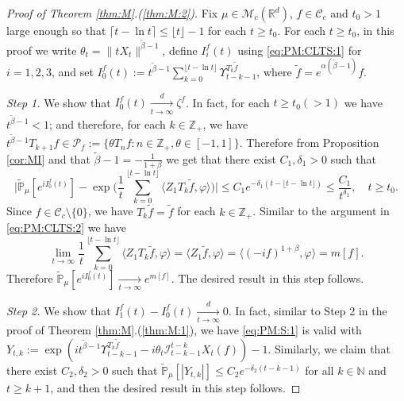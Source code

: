 \documentclass[EJP]{ejpecp} %
\begin{document}
\begin{proof}[Proof of Theorem \ref{thm:M}.(\ref{thm:M:2})]
	Fix $\mu\in \mathcal M_c(\mathbb R^d)$, $f\in \mathcal C_c$ and $t_0 > 1$ large enough so that $ \lceil t - \ln t\rceil \leq \lfloor t \rfloor - 1$ for each $t\geq t_0$.
	For each $t\geq t_0$, in this proof we write $\theta_t = \|t X_t\|^{\tilde \beta - 1}$,  define $I_i^f(t)$ using \eqref{eq:PM:CLTS:1}  for $i = 1,2,3$, and set $ I^f_0(t) := t^{\tilde \beta - 1}\sum_{k=0}^{\lfloor t-\ln t \rfloor} \Upsilon_{t-k-1}^{T_{k} \tilde f}$, where $\tilde f = e^{\alpha(\tilde \beta - 1)} f$.

	\emph{Step 1.} We show that $I^f_0(t) \xrightarrow[t\to \infty]{d} \zeta^f$.
	In fact, for each $t \geq  t_0( > 1)$ we have $t^{\tilde \beta - 1} < 1$; and therefore, for each $k \in \mathbb Z_+$, we have $t^{\tilde \beta - 1} T_{k+1} f \in \mathcal P_f:=\{\theta T_n f: n \in \mathbb Z_+, \theta \in [-1,1]\}$.
	Therefore from Proposition \ref{cor:MI} and that $\tilde \beta - 1 = -\frac{1}{1+\beta}$ we get that there exist $C_1,\delta_1 > 0$ such that
\[
    \Big|\mathbb{\widetilde{P}}_{\mu} [e^{i I^f_0(t)} ]-\exp\Big(\frac{1}{t}\sum_{k=0}^{\lfloor t-\ln t \rfloor} \langle Z_1T_{k}\tilde f, \varphi\rangle \Big)\Big|
    \leq C_1 e^{-\delta_1(t - \lfloor t - \ln t\rfloor)}
    \leq \frac{C_1}{t^{\delta_1}},
    \quad t\geq t_0.
\]
	Since $f \in \mathcal C_c\setminus \{0\}$, we have $T_k \tilde f = \tilde f$ for each $k \in \mathbb Z_+$.
	Similar to the argument in \eqref{eq:PM:CLTS:2} we have
\begin{equation}
\label{CLT:C:eq:m}
    \lim_{t\to \infty} \frac{1}{t}\sum_{k=0}^{\lfloor t-\ln t \rfloor} \langle Z_1 T_{k}\tilde f, \varphi\rangle
    = \langle Z_1 \tilde f,\varphi \rangle
    = \langle (-if)^{1+\beta}, \varphi \rangle
    = m[f].
\end{equation}
	Therefore $\mathbb {\widetilde P}_\mu[e^{i I^f_0(t)}] \xrightarrow[t\to \infty]{} e^{m[f]}$.
	The desired result in this step follows.

	\emph{Step 2.} We show that $ I^f_1(t) - I^f_0 (t) \xrightarrow[t\to \infty]{d} 0$.
  	In fact, similar to Step 2 in the proof of Theorem \ref{thm:M}.(\ref{thm:M:1}), we  have \eqref{eq:PM:S:1} is valid with $ Y_{t,k} := \exp(i t^{\tilde \beta - 1} \Upsilon_{t-k-1}^{T_{k}\tilde f} - i\theta_t \mathcal I_{t-k-1}^{t-k} X_t(f)) - 1$.
  	Similarly, we claim that there exist $C_2, \delta_2>0$ such that $\widetilde {\mathbb P}_\mu [|Y_{t,k}|] \leq C_2 e^{-\delta_2 (t-k-1)}$ for all $k\in \mathbb N$ and $t\geq k+1$, and  then the desired result in this step follows.


\end{proof}
\end{document}

